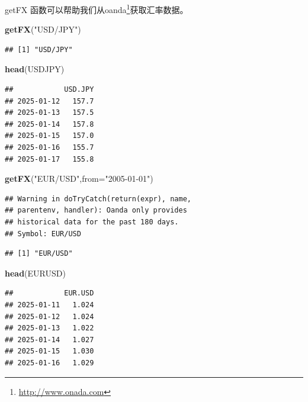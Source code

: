 \documentclass[]{ctexbook}
\newenvironment{Shaded}{\begin{snugshade}}{\end{snugshade}}
\newcommand{\AttributeTok}[1]{\textcolor[rgb]{0.13,0.29,0.53}{#1}}
\newcommand{\FunctionTok}[1]{\textcolor[rgb]{0.13,0.29,0.53}{\textbf{#1}}}
\newcommand{\NormalTok}[1]{#1}
\newcommand{\StringTok}[1]{\textcolor[rgb]{0.31,0.60,0.02}{#1}}
\renewcommand{\href}[2]{#2\footnote{\url{#1}}}
\begin{document}
getFX 函数可以帮助我们从\href{http://www.onada.com}{oanda}获取汇率数据。

\begin{Shaded}
\begin{Highlighting}[]
\FunctionTok{getFX}\NormalTok{(}\StringTok{"USD/JPY"}\NormalTok{)}
\end{Highlighting}
\end{Shaded}

\begin{verbatim}
## [1] "USD/JPY"
\end{verbatim}

\begin{Shaded}
\begin{Highlighting}[]
\FunctionTok{head}\NormalTok{(USDJPY)}
\end{Highlighting}
\end{Shaded}

\begin{verbatim}
##            USD.JPY
## 2025-01-12   157.7
## 2025-01-13   157.5
## 2025-01-14   157.8
## 2025-01-15   157.0
## 2025-01-16   155.7
## 2025-01-17   155.8
\end{verbatim}

\begin{Shaded}
\begin{Highlighting}[]
\FunctionTok{getFX}\NormalTok{(}\StringTok{"EUR/USD"}\NormalTok{,}\AttributeTok{from=}\StringTok{"2005{-}01{-}01"}\NormalTok{)}
\end{Highlighting}
\end{Shaded}

\begin{verbatim}
## Warning in doTryCatch(return(expr), name,
## parentenv, handler): Oanda only provides
## historical data for the past 180 days.
## Symbol: EUR/USD
\end{verbatim}

\begin{verbatim}
## [1] "EUR/USD"
\end{verbatim}

\begin{Shaded}
\begin{Highlighting}[]
\FunctionTok{head}\NormalTok{(EURUSD)}
\end{Highlighting}
\end{Shaded}

\begin{verbatim}
##            EUR.USD
## 2025-01-11   1.024
## 2025-01-12   1.024
## 2025-01-13   1.022
## 2025-01-14   1.027
## 2025-01-15   1.030
## 2025-01-16   1.029
\end{verbatim}
\end{document}
